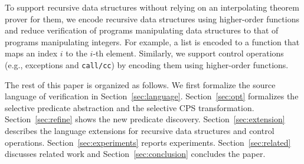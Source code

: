 \begin{enumerate}
      To support recursive data structures without relying on
      an interpolating theorem prover for them, 
      we encode recursive data structures using higher-order functions
   and reduce verification of programs manipulating data structures
   to that of programs manipulating integers.  For example, a list is
      encoded to a function that maps an index $i$ to the $i$-th
      element.  Similarly, we support control operations (e.g.,
      exceptions and \texttt{call/cc}) by encoding them 
    using higher-order functions.
\end{enumerate}
\vspace{-5pt}


The rest of this paper is organized as follows.
We first formalize the source language of verification in
Section~\ref{sec:language}.  Section~\ref{sec:opt} formalizes the
selective predicate abstraction and the selective CPS transformation.
Section~\ref{sec:refine} shows the new predicate discovery.
Section~\ref{sec:extension} describes the language extensions for recursive
data structures and control operations.  Section~\ref{sec:experiments}
reports experiments.  Section~\ref{sec:related} discusses related work
and Section~\ref{sec:conclusion} concludes the paper.














